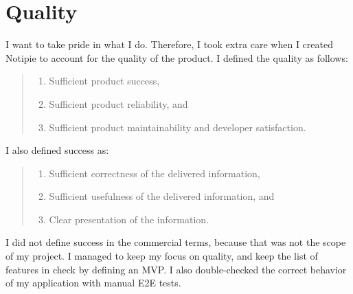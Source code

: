 \section{Quality}\label{sec:quality}

I want to take pride in what I do.
Therefore,
I took extra care when I created Notipie
to account for the quality of the product.
I defined the quality as follows:

\begin{quote}
  \begin{enumerate}
    \item Sufficient product success,
    \item Sufficient product reliability, and
    \item Sufficient product maintainability and developer satisfaction.
  \end{enumerate}
\end{quote}

I also defined success as:

\begin{quote}
  \begin{enumerate}
    \item Sufficient correctness of the delivered information,
    \item Sufficient usefulness of the delivered information, and
    \item Clear presentation of the information.
  \end{enumerate}
\end{quote}

I did not define success in the commercial terms,
because that was not the scope of my project.
I managed to keep my focus on quality,
and keep the list of features in check
by defining an MVP.
I also double-checked the correct behavior
of my application with manual E2E tests.



